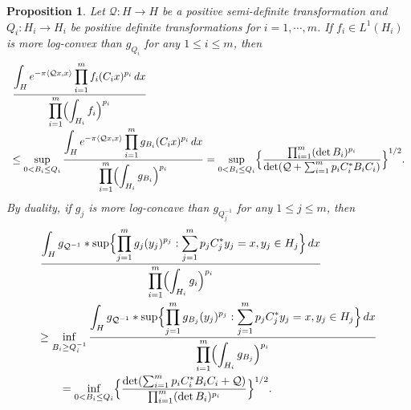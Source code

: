 \documentclass[11pt,a4paper,reqno]{amsart}
\numberwithin{equation}{section}
\newtheorem{proposition}[theorem]{Proposition}
\theoremstyle{definition}
\newcommand{\nm}{\noalign{\smallskip}}
\newcommand{\ds}{\displaystyle}
\newcommand{\<}{\ensuremath \leq}
\renewcommand{\>}{\ensuremath \geq}
\begin{document}
\begin{proposition} \label{Theorem_REG_BL}
    Let $\mathcal{Q}: H \rightarrow H$ be a positive semi-definite transformation and $Q_i: H_i \rightarrow H_i$ be positive definite transformations for $i=1,\cdots,m$. If $f_i \in L^1(H_i)$ is more log-convex than $g_{Q_i}$ for any $1 \leq i \leq m$, then \begin{equation} \label{Reg_BL_Log_Convexity} \begin{array}{lll} \ds \frac{\ds \int_H e^{-\pi \langle \mathcal{Q}x,x\rangle}\prod_{i=1}^m f_i(C_ix)^{p_i}\, dx}{\ds \prod_{i=1}^m \Bigl(\int_{H_i}f_i \Bigl)^{p_i}} \\ \leq \ds \sup_{0<B_i \leq Q_i}\frac{\ds \int_H e^{-\pi \langle \mathcal{Q}x,x\rangle}\prod_{i=1}^m g_{B_i}(C_ix)^{p_i}\, dx}{\ds \prod_{i=1}^m \Bigl(\int_{H_i}g_{B_i} \Bigl)^{p_i}}=\sup_{0<B_i \leq Q_i}\Bigl \{ \frac{\prod_{i=1}^m (\det B_i)^{p_i}}{\det(\mathcal{Q}+\sum_{i=1}^m p_iC_i^* B_iC_i)}\Bigl \}^{1/2}.
    \end{array}\end{equation} By duality, if $g_j$ is more log-concave than $g_{Q_j^{-1}}$ for any $1 \leq j \leq m$, then \begin{equation} \label{Reg_Dual_BL_Log_Concavity} \begin{array}{l}
    \ds \frac{\ds \int_{H}g_{\mathcal{Q}^{-1}} * \sup \Bigl \{ \prod_{j=1}^m g_j(y_j)^{p_j}: \sum_{j=1}^m p_jC_j^*y_j=x, y_j \in H_j\Bigl \}\, dx}{\ds \prod_{i=1}^m \Bigl( \int_{H_i}g_i\Bigl)^{p_i}} \\ 
    \nm 
    \geq \ds \inf_{B_i \geq Q_i^{-1}}\frac{\ds \int_{H}g_{\mathcal{Q}^{-1}} * \sup \Bigl \{ \prod_{j=1}^m g_{B_j}(y_j)^{p_j}: \sum_{j=1}^m p_jC_j^*y_j=x, y_j \in H_j\Bigl \}\, dx}{\ds \prod_{i=1}^m \Bigl( \int_{H_i}g_{B_j}\Bigl)^{p_i}}  \\
    \nm 
    \qquad = \ds \inf_{0<B_i \leq Q_i} \Bigl \{ \frac{\det(\sum_{i=1}^m p_i C_i^*B_iC_i+\mathcal{Q})}{\prod_{i=1}^m (\det B_i)^{p_i}}  \Bigl \}^{1/2}.\end{array} \end{equation} 

    
   

\end{proposition}
\end{document}
